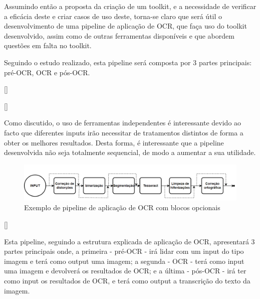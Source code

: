  
Assumindo então a proposta da criação de um toolkit, e a necessidade de verificar a eficácia deste e criar casos de uso deste, torna-se claro que será útil o desenvolvimento de uma pipeline de aplicação de OCR, que faça uso do toolkit desenvolvido, assim como de outras ferramentas disponíveis e que abordem questões em falta no toolkit.

Seguindo o estudo realizado, esta pipeline será composta por 3 partes principais: pré-OCR, OCR e pós-OCR.





[\normalsize]

[\normalsize]
 
 
Como discutido, o uso de ferramentas independentes é interessante devido ao facto que diferentes inputs irão necessitar de tratamentos distintos de forma a obter os melhores resultados. Desta forma, é interessante que a pipeline desenvolvida não seja totalmente sequencial, de modo a aumentar a sua utilidade.



\begin{figure}[H]
	\centering
	\includegraphics[width=1\textwidth]{images/diagramas/pipeline_exemplo_opcoes.png}
	\caption{Exemplo de pipeline de aplicação de OCR com blocos opcionais}
	\label{fig:pipeline_example_options}
\end{figure}


[\normalsize]

Esta pipeline, seguindo a estrutura explicada de aplicação de OCR, apresentará 3 partes principais onde, a primeira - pré-OCR - irá lidar com um input do tipo imagem e terá como output uma imagem; a segunda - OCR - terá como input uma imagem e devolverá os resultados de OCR; e a última - pós-OCR - irá ter como input os resultados de OCR, e terá como output a transcrição do texto da imagem.

